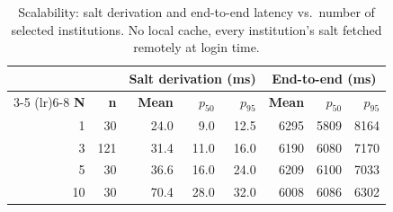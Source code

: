 \begin{table}[t]
  \centering
  \caption{Scalability: salt derivation and end-to-end latency vs.\ number of
    selected institutions. No local cache, every institution's salt fetched
    remotely at login time.}
  \label{tab:scalability}
  \footnotesize
  \begin{tabular}{rrrrrrrr}
    \toprule
    & & \multicolumn{3}{c}{\textbf{Salt derivation (ms)}} & \multicolumn{3}{c}{\textbf{End-to-end (ms)}} \\
    \cmidrule(lr){3-5} \cmidrule(lr){6-8}
    \textbf{N} & \textbf{n} & \textbf{Mean} & \textbf{$p_{50}$} & \textbf{$p_{95}$} & \textbf{Mean} & \textbf{$p_{50}$} & \textbf{$p_{95}$} \\
    \midrule
  1 & 30 & 24.0 & 9.0 & 12.5 & 6295 & 5809 & 8164 \\
  3 & 121 & 31.4 & 11.0 & 16.0 & 6190 & 6080 & 7170 \\
  5 & 30 & 36.6 & 16.0 & 24.0 & 6209 & 6100 & 7033 \\
  10 & 30 & 70.4 & 28.0 & 32.0 & 6008 & 6086 & 6302 \\
    \bottomrule
  \end{tabular}
\end{table}
